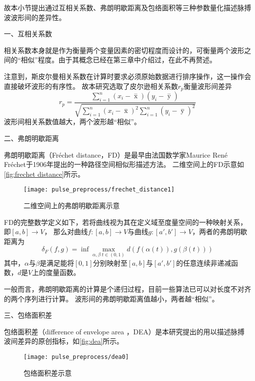 故本小节提出通过互相关系数、弗朗明歇距离及包络面积等三种参数量化描述脉搏波波形间的差异性。

一、互相关系数

相关系数本身就是作为衡量两个变量因素的密切程度而设计的，可衡量两个波形之间的“相似”程度。由于其概念已经在第三章中介绍过，在此不再赘述。

注意到，斯皮尔曼相关系数在计算时要求必须原始数据进行排序操作，这一操作会直接破坏波形的有序性。
故本研究选取了皮尔逊相关系数$r_p$衡量波形间差异
\begin{equation}
    \label{equ:pearson2}
    r_p=\frac{\sum_{i=1}^n{(x_i- \mathop{x} \limits^-)(y_i- \mathop{y} \limits^-)}}{\sqrt{{\sum_{i=1}^n}{{(x_i- \mathop{x} \limits^-)^2\sum_{i=1}^n}{(y_i- \mathop{y} \limits^-)^2}}}}
\end{equation}
波形间相关系数值越大，两个波形越“相似”。

二、弗朗明歇距离

弗朗明歇距离（Fréchet distance，FD）是最早由法国数学家Maurice René Fréchet于1906年提出的一种路径空间相似形描述方法\cite{Wien1994,Kaveh2013,GN2017}。
二维空间上的FD示意如\autoref{fig:frechet distance}所示。

\begin{figure}[htbp]
  \centering
  \texttt{[image: pulse\_preprocess/frechet\_distance1]}
  \caption{\label{fig:frechet distance}二维空间上的弗朗明歇距离示意}
\end{figure}

FD的完整数学定义如下，若将曲线视为其在定义域至度量空间的一种映射关系，即$[a,b]\rightarrow V$，
那么对曲线$f:[a,b]\rightarrow V$与曲线$g:[a',b']\rightarrow V$，两者的弗朗明歇距离为
\begin{equation}
    \label{equ:frechet distance}
    \delta_F(f,g)=\inf \max \limits_{\alpha,\beta \; t \in (0,1)} d(f(\alpha(t)), g(\beta(t)))
\end{equation}
其中，$\alpha$与$\beta$是满足能将$[0,1]$分别映射至$[a,b]$与$[a',b']$的任意连续非递减函数，$d$是$V$上的度量函数\cite{Wien1994}。

一般而言，弗朗明歇距离的计算是个递归过程，目前一些算法已可以对长度不对齐的两个序列进行计算\cite{derohde2022}。
波形间的弗朗明歇距离值越小，两者越“相似”。

三、包络面积差

包络面积差（difference of envelope area ，DEA）是本研究提出的用以描述脉搏波间差异的原创指标，如\autoref{fig:dea}所示。

\begin{figure}[htbp]
  \centering
  \texttt{[image: pulse\_preprocess/dea0]}
  \caption[包络面积差示意]{\label{fig:dea}包络面积差示意}
\end{figure}

